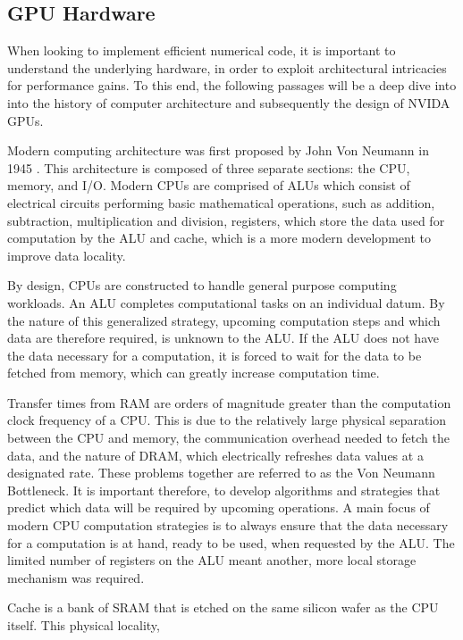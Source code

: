 \subsection{GPU Hardware}
When looking to implement efficient numerical code, it is important to understand
 the underlying hardware, in order to exploit architectural intricacies for performance gains.
 To this end, the following passages will be a deep dive into into the history of
 computer architecture and subsequently the design of NVIDA \Glspl{GPU}.
\par
Modern computing architecture was first proposed by John Von Neumann in 1945 \cite{vonNeumann}.
This architecture is composed of three separate sections: the \Gls{CPU}, memory, and \Gls{I/O}.
Modern \Glspl{CPU} are comprised of \Glspl{ALU} which consist of electrical circuits
performing basic mathematical operations, such as addition, subtraction, multiplication and division,
registers, which store the data used for computation by the ALU and cache, which is a more modern development to improve data locality.
\par
By design, \Glspl{CPU} are constructed
to handle general purpose computing workloads.
An \Gls{ALU} completes computational
tasks on an individual datum. By the nature of this
generalized strategy, upcoming computation steps and which data are therefore required,
is unknown to the \Gls{ALU}. If the ALU does not have the data necessary for a computation,
it is forced to wait for the data to be fetched from memory, which can greatly increase computation time.
\par
Transfer times from \Gls{RAM}
are orders of magnitude greater than the computation clock frequency of
a CPU.  This is due to the relatively large physical separation between the CPU and memory,
 the communication overhead needed to fetch the data, and
the nature of \Gls{DRAM}, which electrically refreshes data values at a designated rate.
These problems together are referred to as the Von Neumann Bottleneck\cite{Backus}.
It is important therefore, to develop algorithms and strategies that  predict which data will be required by upcoming operations.
A main focus of modern CPU computation strategies is to always ensure that the data
necessary for a computation is at hand, ready to be used, when requested by the \Gls{ALU}.
The limited number of registers on the ALU meant another, more local storage mechanism
was required.
\par
Cache is a bank of \Gls{SRAM}
that is etched on the same silicon wafer as the CPU itself.  This physical locality,
